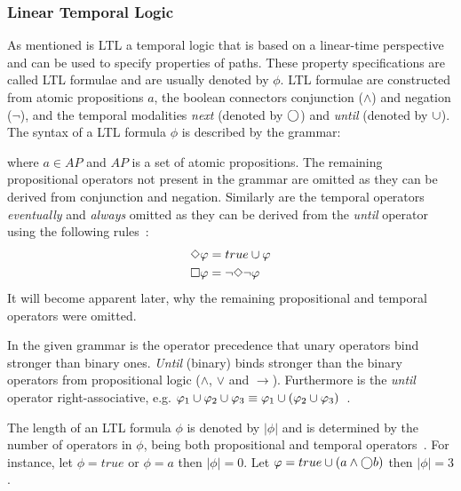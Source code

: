 \subsubsection{Linear Temporal Logic}
\label{sec:ltl}
As mentioned is LTL a temporal logic that is based on a linear-time perspective and can be used to specify properties of paths. These property specifications are called LTL formulae and are usually denoted by $\phi$. LTL formulae are constructed from atomic propositions $a$, the boolean connectors conjunction ($\land$) and negation ($\lnot$), and the temporal modalities \emph{next} (denoted by $\bigcirc$) and \emph{until} (denoted by $\cup$). The syntax of a LTL formula $\phi$ is described by the grammar:

where $a \in AP$ and $AP$ is a set of atomic propositions. The remaining propositional operators not present in the grammar are omitted as they can be derived from conjunction and negation. Similarly are the temporal operators \emph{eventually} and \emph{always} omitted as they can be derived from the \emph{until} operator using the following rules~\cite[p.~232]{baier2008principles}:
\begin{align}
    &\Diamond \varphi = true \cup \varphi \label{eq:eventually} \\
    &\square \varphi = \lnot \Diamond \lnot \varphi \label{eq:always}
\end{align}
It will become apparent later, why the remaining propositional and temporal operators were omitted.

In the given grammar is the operator precedence that unary operators bind stronger than binary ones. \emph{Until} (binary) binds stronger than the binary operators from propositional logic ($\land$, $\lor$ and $\to$). Furthermore is the \emph{until} operator right-associative, e.g. $\varphi_1 \cup \varphi_2 \cup \varphi_3 \equiv \varphi_1 \cup \left(\varphi_2 \cup \varphi_3\right)$~\cite{baier2008principles}.

The length of an LTL formula $\phi$ is denoted by $| \phi |$ and is determined by the number of operators in $\phi$, being both propositional and temporal operators~\cite{baier2008principles}. For instance, let $\phi= true$ or $\phi= a$ then $| \phi | = 0$. Let $\varphi= true \cup \left( a \land \bigcirc b \right)$ then $| \phi | = 3$.

